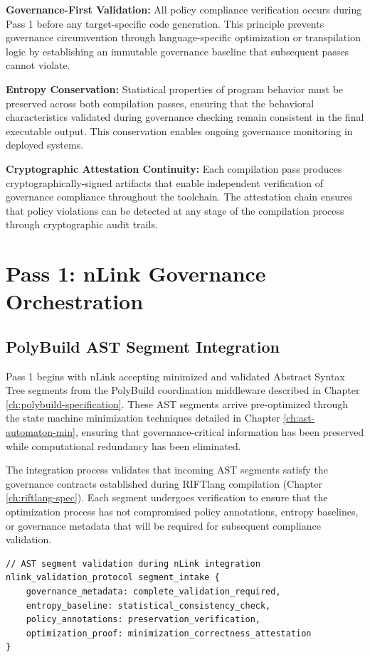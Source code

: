 \textbf{Governance-First Validation:} All policy compliance verification occurs during Pass 1 before any target-specific code generation. This principle prevents governance circumvention through language-specific optimization or transpilation logic by establishing an immutable governance baseline that subsequent passes cannot violate.

\textbf{Entropy Conservation:} Statistical properties of program behavior must be preserved across both compilation passes, ensuring that the behavioral characteristics validated during governance checking remain consistent in the final executable output. This conservation enables ongoing governance monitoring in deployed systems.

\textbf{Cryptographic Attestation Continuity:} Each compilation pass produces cryptographically-signed artifacts that enable independent verification of governance compliance throughout the toolchain. The attestation chain ensures that policy violations can be detected at any stage of the compilation process through cryptographic audit trails.

\section{Pass 1: nLink Governance Orchestration}

\subsection{PolyBuild AST Segment Integration}

Pass 1 begins with nLink accepting minimized and validated Abstract Syntax Tree segments from the PolyBuild coordination middleware described in Chapter \ref{ch:polybuild-specification}. These AST segments arrive pre-optimized through the state machine minimization techniques detailed in Chapter \ref{ch:ast-automaton-min}, ensuring that governance-critical information has been preserved while computational redundancy has been eliminated.

The integration process validates that incoming AST segments satisfy the governance contracts established during RIFTlang compilation (Chapter \ref{ch:riftlang-spec}). Each segment undergoes verification to ensure that the optimization process has not compromised policy annotations, entropy baselines, or governance metadata that will be required for subsequent compliance validation.

\begin{lstlisting}[style=riftlang, language=rift]
// AST segment validation during nLink integration
nlink_validation_protocol segment_intake {
    governance_metadata: complete_validation_required,
    entropy_baseline: statistical_consistency_check,
    policy_annotations: preservation_verification,
    optimization_proof: minimization_correctness_attestation
}
\end{lstlisting}


